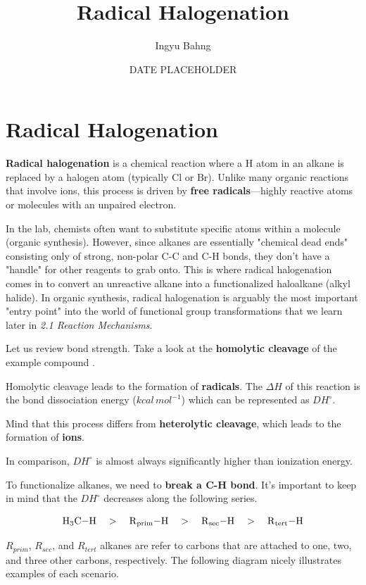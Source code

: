 \documentclass[10pt]{article}
\title{Radical Halogenation}
\date{DATE PLACEHOLDER}
\author{Ingyu Bahng}
\begin{document}


\section{Radical Halogenation}

  \textbf{Radical halogenation} is a chemical reaction where a H atom in an alkane is replaced by a halogen atom (typically Cl or Br). Unlike many organic reactions that involve ions, this process is driven by \textbf{free radicals}---highly reactive atoms or molecules with an unpaired electron.

  In the lab, chemists often want to substitute specific atoms within a molecule (organic synthesis). However, since alkanes are essentially "chemical dead ends" consisting only of strong, non-polar C-C and C-H bonds, they don't have a "handle" for other reagents to grab onto. This is where radical halogenation comes in to convert an unreactive alkane into a functionalized haloalkane (alkyl halide). In organic synthesis, radical halogenation is arguably the most important "entry point" into the world of functional group transformations that we learn later in \textit{2.1 Reaction Mechanisms}.

  Let us review bond strength. Take a look at the \textbf{homolytic cleavage} of the example compound .


  Homolytic cleavage leads to the formation of \textbf{radicals}. The $\Delta H$ of this reaction is the bond dissociation energy ($kcal\,mol^{-1}$) which can be represented as $DH^{\circ}$.

  Mind that this process differs from \textbf{heterolytic cleavage}, which leads to the formation of \textbf{ions}.


  In comparison, $DH^{\circ}$ is almost always significantly higher than ionization energy.

  To functionalize alkanes, we need to \textbf{break a C-H bond}. It's important to keep in mind that the $DH^{\circ}$ decreases along the following series.

  \[
      \ce{H3C-H} \quad > \quad \ce{R_{prim}-H} \quad > \quad \ce{R_{sec}-H} \quad > \quad \ce{R_{tert}-H}
  \]

  $R_{prim}$, $R_{sec}$, and $R_{tert}$ alkanes are refer to carbons that are attached to one, two, and three other carbons, respectively. The following diagram nicely illustrates examples of each scenario.
\end{document}
